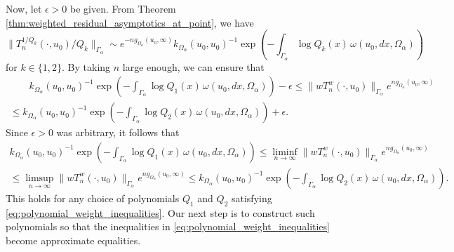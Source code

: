 \documentclass[12pt,oneside,reqno]{amsart}
\theoremstyle{definition}
\numberwithin{equation}{section}
\renewcommand{\Cap}{\operatorname{Cap}}
\begin{document}
Now, let $\epsilon>0$ be given. From Theorem \ref{thm:weighted_residual_asymptotics_at_point}, we have
\[\|T_n^{1/Q_k}(\cdot,u_0)/Q_k\|_{\Gamma_\alpha}\sim e^{-ng_{\Omega_\alpha}(u_0,\infty)}k_{\Omega_\alpha}(u_0,u_0)^{-1}\exp\left(-\int_{\Gamma_\alpha}\log Q_k(x)\,\omega(u_0,dx,\Omega_{\alpha})\right)\]
for $k\in \{1,2\}$.
By taking $n$ large enough, we can ensure that
\begin{multline*}
\qquad k_{\Omega_\alpha}(u_0,u_0)^{-1} \exp\left(-\int_{\Gamma_\alpha}\log Q_1(x)\,
\omega(u_0,dx,\Omega_{\alpha})\right)-\epsilon\leq 
\|w T_n^{w}(\cdot,u_0)\|_{\Gamma_\alpha}e^{ng_{\Omega_\alpha}(u_0,\infty)} \\
\leq k_{\Omega_\alpha}(u_0,u_0)^{-1}\exp\left(-\int_{\Gamma_\alpha}\log Q_2(x)\,\omega(u_0,dx,\Omega_{\alpha})\right)+\epsilon. \qquad	
\end{multline*}
Since $\epsilon>0$ was arbitrary, it follows that
\begin{multline}
k_{\Omega_\alpha}(u_0,u_0)^{-1}\exp\left(-\int_{\Gamma_\alpha}\log Q_1(x)\,
\omega(u_0,dx,\Omega_{\alpha})\right)
\leq \liminf_{n\rightarrow \infty} 
\|w T_n^{w}(\cdot,u_0)\|_{\Gamma_\alpha}e^{ng_{\Omega_\alpha}(u_0,\infty)}\label{eq:polynomial_approximation_above_below} \\
\leq \limsup_{n\rightarrow \infty} 
\|wT_n^{w}(\cdot,u_0)\|_{\Gamma_\alpha}e^{ng_{\Omega_\alpha}(u_0,\infty)} 
\leq k_{\Omega_\alpha}(u_0,u_0)^{-1}\exp\left(-\int_{\Gamma_\alpha}\log Q_2(x)\,
\omega(u_0,dx,\Omega_{\alpha})\right). %
\end{multline}
This holds for any choice of polynomials $Q_1$ and $Q_2$ satisfying \eqref{eq:polynomial_weight_inequalities}. Our next step is to construct such polynomials so that the inequalities in \eqref{eq:polynomial_weight_inequalities} become approximate equalities.
\end{document}
